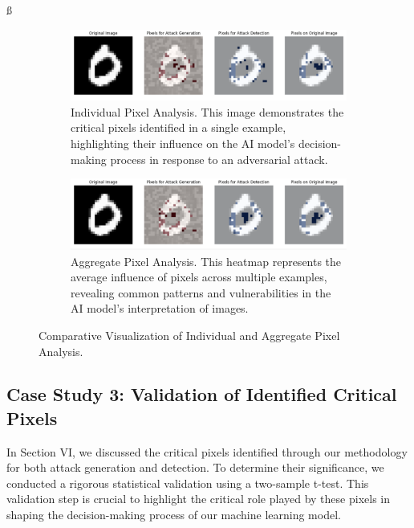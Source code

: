 \documentclass[10pt, conference, a4paper, final]{IEEEtran}
\begin{document}
  ß
  \begin{figure}[h]
    \centering
    \begin{subfigure}{.45\textwidth}
        \centering
        \includegraphics[width=\linewidth]{paper_images/individual.png}
        \caption{Individual Pixel Analysis. This image demonstrates the critical pixels identified in a single example, highlighting their influence on the AI model's decision-making process in response to an adversarial attack.}
        \label{fig:individual_analysis}
    \end{subfigure}
    \par\medskip %
    \begin{subfigure}{.45\textwidth}
        \centering
        \includegraphics[width=\linewidth]{paper_images/aggregate.png}
        \caption{Aggregate Pixel Analysis. This heatmap represents the average influence of pixels across multiple examples, revealing common patterns and vulnerabilities in the AI model's interpretation of images.}
        \label{fig:aggregate_analysis}
    \end{subfigure}
    \caption{Comparative Visualization of Individual and Aggregate Pixel Analysis.}
    \label{fig:pixel_analysis}
\end{figure}

  \subsection{Case Study 3: Validation of Identified Critical Pixels}
    In Section VI, we discussed the critical pixels identified through our methodology for both attack generation and detection. To determine their significance, we conducted a rigorous statistical validation using a two-sample t-test. This validation step is crucial to highlight the critical role played by these pixels in shaping the decision-making process of our machine learning model.
\end{document}
